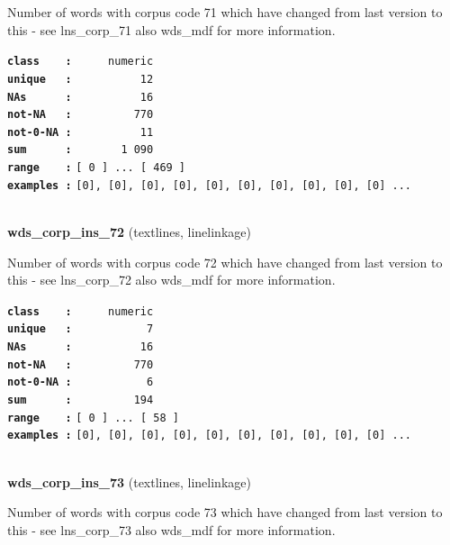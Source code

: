 \documentclass[]{article}
\begin{document}
Number of words with corpus code 71 which have changed from last version
to this - see lns\_corp\_71 also wds\_mdf for more information.

\textbf{\texttt{class\ \ \ \ :}} \texttt{~~~~~numeric}\\
\textbf{\texttt{unique\ \ \ :}} \texttt{~~~~~~~~~~12}\\
\textbf{\texttt{NAs\ \ \ \ \ \ :}} \texttt{~~~~~~~~~~16}\\
\textbf{\texttt{not-NA\ \ \ :}} \texttt{~~~~~~~~~770}\\
\textbf{\texttt{not-0-NA\ :}} \texttt{~~~~~~~~~~11}\\
\textbf{\texttt{sum\ \ \ \ \ \ :}} \texttt{~~~~~~~1~090}\\
\textbf{\texttt{range\ \ \ \ :}}
\texttt{{[}\ 0\ {]}\ ...\ {[}\ 469\ {]}}\\
\textbf{\texttt{examples\ :}}
\texttt{{[}0{]},\ {[}0{]},\ {[}0{]},\ {[}0{]},\ {[}0{]},\ {[}0{]},\ {[}0{]},\ {[}0{]},\ {[}0{]},\ {[}0{]}\ ...}\\

~

\textbf{wds\_corp\_ins\_72} (textlines, linelinkage)

Number of words with corpus code 72 which have changed from last version
to this - see lns\_corp\_72 also wds\_mdf for more information.

\textbf{\texttt{class\ \ \ \ :}} \texttt{~~~~~numeric}\\
\textbf{\texttt{unique\ \ \ :}} \texttt{~~~~~~~~~~~7}\\
\textbf{\texttt{NAs\ \ \ \ \ \ :}} \texttt{~~~~~~~~~~16}\\
\textbf{\texttt{not-NA\ \ \ :}} \texttt{~~~~~~~~~770}\\
\textbf{\texttt{not-0-NA\ :}} \texttt{~~~~~~~~~~~6}\\
\textbf{\texttt{sum\ \ \ \ \ \ :}} \texttt{~~~~~~~~~194}\\
\textbf{\texttt{range\ \ \ \ :}}
\texttt{{[}\ 0\ {]}\ ...\ {[}\ 58\ {]}}\\
\textbf{\texttt{examples\ :}}
\texttt{{[}0{]},\ {[}0{]},\ {[}0{]},\ {[}0{]},\ {[}0{]},\ {[}0{]},\ {[}0{]},\ {[}0{]},\ {[}0{]},\ {[}0{]}\ ...}\\

~

\textbf{wds\_corp\_ins\_73} (textlines, linelinkage)

Number of words with corpus code 73 which have changed from last version
to this - see lns\_corp\_73 also wds\_mdf for more information.
\end{document}
